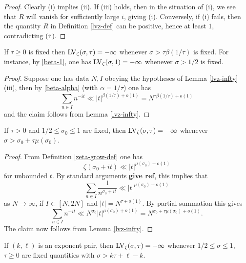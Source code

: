 \begin{proof} Clearly (i) implies (ii).
If (iii) holds, then in the situation of (i), we see that $R$ will vanish for sufficiently large $i$, giving (i). Conversely, if (i) fails, then the quantity $R$ in Definition \ref{lvz-def} can be positive, hence at least $1$, contradicting (ii).
\end{proof}

\begin{corollary}\label{beta-zeta-vanish}  If $\tau \geq 0$ is fixed then $\mathrm{LV}_\zeta(\sigma,\tau) = -\infty$ whenever $\sigma > \tau \beta(1/\tau)$ is fixed. For instance, by \eqref{beta-1}, one has $\mathrm{LV}_\zeta(\sigma,1)=-\infty$ whenever $\sigma > 1/2$ is fixed.
\end{corollary}

\begin{proof} Suppose one has data $N, I$  obeying the hypotheses of Lemma \ref{lvz-infty}(iii), then by \eqref{beta-alpha} (with $\alpha = 1/\tau$) one has
$$ \sum_{n \in I} n^{-it} \ll |t|^{\beta(1/\tau)+o(1)} = N^{\tau \beta(1/\tau)+o(1)}$$
and the claim follows from Lemma \ref{lvz-infty}.
\end{proof}

\begin{corollary}\label{lvz-mu}  If $\tau > 0$ and $1/2 \leq \sigma_0 \leq 1$ are fixed, then $\mathrm{LV}_\zeta(\sigma,\tau) = -\infty$ whenever $\sigma > \sigma_0 + \tau \mu(\sigma_0)$.
\end{corollary}

\begin{proof} From Definition \ref{zeta-grow-def} one has
    $$ \zeta(\sigma_0 + it) \ll |t|^{\mu(\sigma_0) + o(1)}$$
    for unbounded $t$.  By standard arguments {\bf give ref}, this implies that
    $$ \sum_{n \in I} \frac{1}{n^{\sigma_0+it}} \ll |t|^{\mu(\sigma_0) + o(1)}$$
as $N \to \infty$, if $I \subset [N,2N]$ and $|t| = N^{\tau+o(1)}$.  By partial summation this gives
$$ \sum_{n \in I} n^{-it} \ll N^{\sigma_0} |t|^{\mu(\sigma_0) + o(1)} = N^{\sigma_0 + \tau \mu(\sigma_0) + o(1)}.$$
The claim now follows from Lemma \ref{lvz-infty}.
\end{proof}

\begin{corollary}\label{lvz-exp} If $(k,\ell)$ is an exponent pair, then $\mathrm{LV}_\zeta(\sigma,\tau) = -\infty$ whenever $1/2 \leq \sigma \leq 1$, $\tau \geq 0$ are fixed quantities with $\sigma > k \tau + \ell - k$.
\end{corollary}

